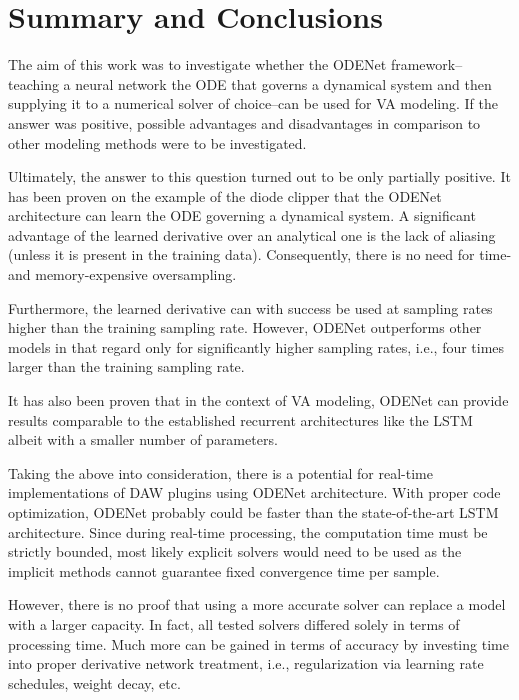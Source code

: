 \chapter{Summary and Conclusions}
\label{chapter:conclusions}

The aim of this work was to investigate whether the ODENet framework--teaching a neural network the \acl{ODE} that governs a dynamical system and then supplying it to a numerical solver of choice--can be used for \acl{VA} modeling. If the answer was positive, possible advantages and disadvantages in comparison to other modeling methods were to be investigated.

Ultimately, the answer to this question turned out to be only partially positive. It has been proven on the example of the diode clipper that the ODENet architecture can learn the \ac{ODE} governing a dynamical system. A significant advantage of the learned derivative over an analytical one is the lack of aliasing (unless it is present in the training data). Consequently, there is no need for time- and memory-expensive oversampling.

Furthermore, the learned derivative can with success be used at sampling rates higher than the training sampling rate. However, ODENet outperforms other models in that regard only for significantly higher sampling rates, i.e., four times larger than the training sampling rate.

It has also been proven that in the context of \ac{VA} modeling, ODENet can provide results comparable to the established recurrent architectures like the \ac{LSTM} albeit with a smaller number of parameters.

Taking the above into consideration, there is a potential for real-time implementations of \ac{DAW} plugins using ODENet architecture. With proper code optimization, ODENet probably could be faster than the state-of-the-art \ac{LSTM} architecture. Since during real-time processing, the computation time must be strictly bounded, most likely explicit solvers would need to be used as the implicit methods cannot guarantee fixed convergence time per sample.

However, there is no proof that using a more accurate solver can replace a model with a larger capacity. In fact, all tested solvers differed solely in terms of processing time. Much more can be gained in terms of accuracy by investing time into proper derivative network treatment, i.e., regularization via learning rate schedules, weight decay, etc.

